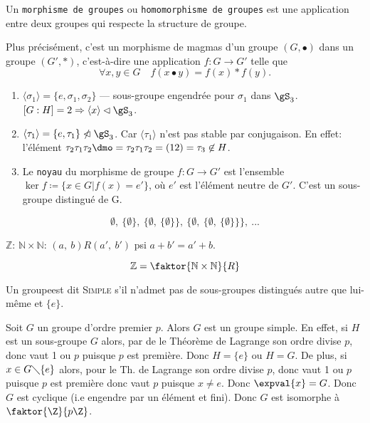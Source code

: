 \begin{rappel}
Un \texttt{morphisme de groupes} ou \texttt{homomorphisme de groupes} est une application entre deux groupes qui respecte la structure de groupe.

Plus précisément, c'est un morphisme de magmas d'un groupe 
$(G,•)$  dans un groupe $(G',\ast)$, c'est-à-dire une application 
$f:G\rightarrow G'$ telle que
$$\forall x,y\in G\quad f(x•y)=f(x)\ast f(y).$$

\end{rappel}

\begin{exercise}
	\begin{enumerate}
		\item $\langle \sigma_1 \rangle=\{e,\sigma_1,\sigma_2\}$ --- sous-groupe engendrée pour $\sigma_1$ dans $\gS_3$. $[G:H]=2\Rightarrow \langle x\rangle\lhd\gS_3$.
		\item $\langle \tau_1\rangle=\{e,\tau_1\} \ntriangleleft \gS_3$. Car $\langle \tau_1 \rangle$ n'est pas stable par conjugaison. En effet: l'élément $\tau_2\tau_1\tau_2\dmo =\tau_2\tau_1\tau_2=(12)=\tau_3 \not\in H$.
		\item Le \texttt{noyau} du morphisme de groupe $f:G\rightarrow G'$ est l'ensemble $\ker f\coloneq\{x\in G | f(x)=e'\}$, où $e'$ est l'élément neutre de $G'$. C'est un sous-groupe distingué de G.
	\end{enumerate}
\end{exercise}

\ifcomment
$$\emptyset,\ \{\emptyset\},\ \{\emptyset,\ \{\emptyset\}\},\ \{\emptyset,\ \{\emptyset,\ \{\emptyset\}\}\},\ ...$$

$\mathbb{Z}$: $\mathbb{N}\times\mathbb{N}$:
$(a,\ b)R(a',\ b')$ psi $a+b'=a' + b$.

$$\mathbb{Z}=\faktor{\mathbb{N}\times\mathbb{N}}{R}$$
\fi


\begin{definition}
	Un groupeest dit \textsc{Simple} s'il n'admet pas de sous-groupes distingués autre que lui-même et $\{e\}$.
\end{definition}

\begin{exercise}
Soit $G$ un groupe d'ordre premier $p$.
		Alors $G$ est un groupe simple. En effet, si $H$ est un sous-groupe $G$ alors, par de le Théorème de Lagrange son ordre divise $p$, donc vaut 1 ou $p$ puisque $p$ est première. Donc $H=\{e\}$ ou $H=G$. De plus, si $x\in G\diagdown  \{e\}$ alors, pour le Th. de Lagrange son ordre divise $p$, donc vaut 1 ou $p$ puisque $p$ est première donc vaut $p$ puisque $x \neq e$. Donc $\expval{x}=G$. Donc $G$ est cyclique (i.e engendre par un élément et fini). Donc $G$ est isomorphe à $\faktor{\Z}{p\Z}$.
\end{exercise}

